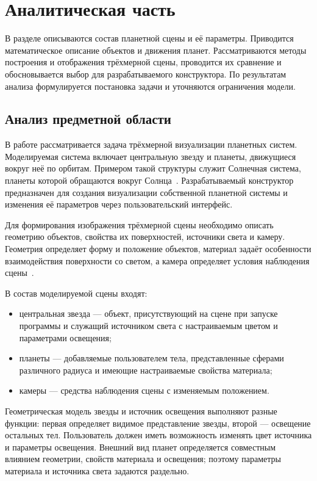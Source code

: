 \documentclass[ordinary]{BMSTU-IU8}
\begin{document}
\section{Аналитическая часть}

В разделе описываются состав планетной сцены и её параметры. Приводится математическое описание объектов
и движения планет. Рассматриваются методы построения и отображения
трёхмерной сцены, проводится их сравнение и обосновывается выбор для
разрабатываемого конструктора. По результатам анализа формулируется
постановка задачи и уточняются ограничения модели.

\subsection{Анализ предметной области}
\label{sec:domain}

В работе рассматривается задача трёхмерной визуализации планетных систем. Моделируемая система включает центральную звезду и планеты, движущиеся вокруг неё по орбитам. Примером такой структуры служит Солнечная система,
планеты которой обращаются вокруг Солнца~\cite{nasa-solar-system}.
Разрабатываемый конструктор предназначен для создания визуализации собственной
планетной системы и изменения её параметров через пользовательский интерфейс.

Для формирования изображения трёхмерной сцены необходимо описать геометрию
объектов, свойства их поверхностей, источники света и камеру. Геометрия
определяет форму и положение объектов, материал задаёт особенности
взаимодействия поверхности со светом, а камера определяет условия
наблюдения сцены~\cite[разд.~1.2]{pharr2023}. 

В состав моделируемой сцены входят:
\begin{itemize}
    \item центральная звезда --- объект, присутствующий на сцене при запуске
    программы и служащий источником света с настраиваемым цветом и
    параметрами освещения;
    \item планеты --- добавляемые пользователем тела, представленные сферами
    различного радиуса и имеющие настраиваемые свойства материала;
    \item камеры --- средства наблюдения сцены с изменяемым положением.
\end{itemize}

Геометрическая модель звезды и источник освещения выполняют разные функции:
первая определяет видимое представление звезды, второй --- освещение
остальных тел. Пользователь должен иметь возможность изменять цвет
источника и параметры освещения. Внешний вид планет определяется
совместным влиянием геометрии, свойств материала и освещения; поэтому
параметры материала и источника света задаются раздельно.
\end{document}
